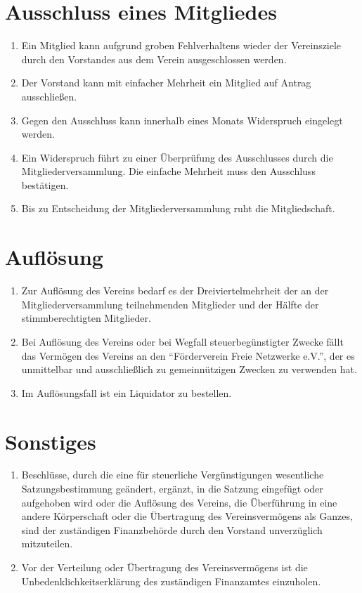 \documentclass[ngerman]{article}
\begin{document}
\section{Ausschluss eines Mitgliedes}
\label{sec:ausschluss}
\begin{enumerate}
  \item Ein Mitglied kann aufgrund groben Fehlverhaltens wieder der Vereinsziele durch den Vorstandes aus dem Verein ausgeschlossen werden.
  \item Der Vorstand kann mit einfacher Mehrheit ein Mitglied auf Antrag ausschließen.
  \item Gegen den Ausschluss kann innerhalb eines Monats Widerspruch eingelegt werden.
  \item Ein Widerspruch führt zu einer Überprüfung des Ausschlusses durch die Mitgliederversammlung. Die einfache Mehrheit muss den Ausschluss bestätigen.
  \item Bis zu Entscheidung der Mitgliederversammlung ruht die Mitgliedschaft.
\end{enumerate}


\section{Auflösung}
\begin{enumerate}
  \item Zur Auflösung des Vereins bedarf es der Dreiviertelmehrheit der an der Mitgliederversammlung teilnehmenden Mitglieder und der Hälfte der stimmberechtigten Mitglieder.
  \item Bei Auflösung des Vereins oder bei Wegfall steuerbegünstigter Zwecke fällt das Vermögen des Vereins an den "`Förderverein Freie Netzwerke e.V."', der es unmittelbar und ausschließlich zu gemeinnützigen Zwecken zu verwenden hat.
  \item Im Auflösungsfall ist ein Liquidator zu bestellen.
\end{enumerate}


\section{Sonstiges}
\begin{enumerate}
  \item Beschlüsse, durch die eine für steuerliche Vergünstigungen wesentliche Satzungsbestimmung geändert, ergänzt, in die Satzung eingefügt oder aufgehoben wird oder die Auflösung des Vereins, die Überführung in eine andere Körperschaft oder die Übertragung des Vereinsvermögens als Ganzes, sind der zuständigen Finanzbehörde durch den Vorstand unverzüglich mitzuteilen.
  \item Vor der Verteilung oder Übertragung des Vereinsvermögens ist die Unbedenklichkeitserklärung des zuständigen Finanzamtes einzuholen.
\end{enumerate}
\end{document}
